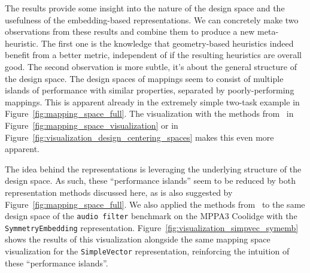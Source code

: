 The results provide some insight into the nature of the design space and the usefulness of the embedding-based representations.
We can concretely make two observations from these results and combine them to produce a new meta-heuristic.
The first one is the knowledge that geometry-based heuristics indeed benefit from a better metric, independent of if the resulting heuristics are overall good.
The second observation is more subtle, it's about the general structure of the design space. 
The design spaces of mappings seem to consist of multiple islands of performance with similar properties, separated by poorly-performing mappings.
This is apparent already in the extremely simple two-task example in Figure~\ref{fig:mapping_space_full}.
The visualization with the methods from~\cite{visualloss} in Figure~\ref{fig:mapping_space_visualization} or in Figure~\ref{fig:visualization_design_centering_spaces} makes this even more apparent.

The idea behind the representations is leveraging the underlying structure of the design space.
As such, these ``performance islands'' seem to be reduced by both representation methods discussed here, as is also suggested by Figure~\ref{fig:mapping_space_full}.
We also applied the methods from~\cite{visualloss} to the same design space of the \texttt{audio filter} benchmark on the MPPA3 Coolidge with the \texttt{SymmetryEmbedding} representation.
Figure~\ref{fig:visualization_simpvec_symemb} shows the results of this visualization alongside the same mapping space visualization for the \texttt{SimpleVector} representation, reinforcing the intuition of these ``performance islands''.

